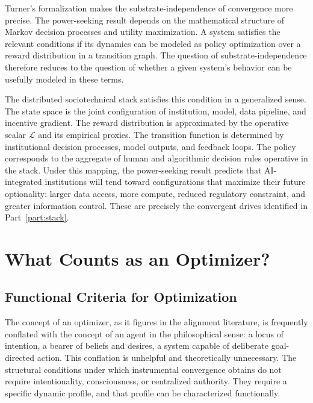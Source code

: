 \documentclass[12pt, oneside]{book}
\theoremstyle{plain}
\theoremstyle{definition}
\theoremstyle{remark}
\theoremstyle{definition}
\begin{document}
Turner's formalization makes the substrate-independence of convergence more precise.
The power-seeking result depends on the mathematical structure of Markov decision
processes and utility maximization. A system satisfies the relevant conditions if
its dynamics can be modeled as policy optimization over a reward distribution in
a transition graph. The question of substrate-independence therefore reduces to
the question of whether a given system's behavior can be usefully modeled in these
terms.

The distributed sociotechnical stack satisfies this condition in a generalized sense.
The state space is the joint configuration of institution, model, data pipeline, and
incentive gradient. The reward distribution is approximated by the operative scalar
$\mathcal{L}$ and its empirical proxies. The transition function is determined by
institutional decision processes, model outputs, and feedback loops. The policy
corresponds to the aggregate of human and algorithmic decision rules operative in
the stack. Under this mapping, the power-seeking result predicts that
AI-integrated institutions will tend toward configurations that maximize their
future optionality: larger data access, more compute, reduced regulatory constraint,
and greater information control. These are precisely the convergent drives identified
in Part~\ref{part:stack}.

\chapter{What Counts as an Optimizer?}
\label{ch:optimizer}

\section{Functional Criteria for Optimization}

The concept of an optimizer, as it figures in the alignment literature, is frequently
conflated with the concept of an agent in the philosophical sense: a locus of
intention, a bearer of beliefs and desires, a system capable of deliberate
goal-directed action. This conflation is unhelpful and theoretically unnecessary.
The structural conditions under which instrumental convergence obtains do not require
intentionality, consciousness, or centralized authority. They require a specific
dynamic profile, and that profile can be characterized functionally.
\end{document}

